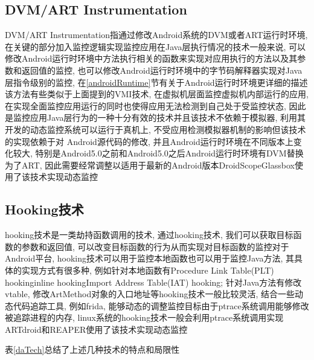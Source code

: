 \subsection{DVM/ART Instrumentation}
\label{artInstr}
DVM/ART Instrumentation指通过修改Android系统的DVM或者ART运行时环境, 在关键的部分加入监控逻辑实现监控应用在Java层执行情况的技术\juhao 一般来说, 可以修改Android运行时环境中方法执行相关的函数来实现对应用执行的方法以及其参数和返回值的监控, 也可以修改Android运行时环境中的字节码解释器实现对Java层指令级别的监控, 在\ref{androidRuntime}节有关于Android运行时环境更详细的描述\juhao 该方法有些类似于上面提到的VMI技术, 在虚拟机层面监控虚拟机内部运行的应用, 在实现全面监控应用运行的同时也使得应用无法检测到自己处于受监控状态, 因此是监控应用Java层行为的一种十分有效的技术\juhao 并且该技术不依赖于模拟器, 利用其开发的动态监控系统可以运行于真机上, 不受应用检测模拟器机制的影响\juhao 但该技术的实现依赖于对
Android源代码的修改, 并且Android运行时环境在不同版本上变化较大, 特别是Android5.0之前和Android5.0之后Android运行时环境有DVM替换为了ART, 因此需要经常调整以适用于最新的Android版本\juhao DroidScope\dunhao Glassbox使用了该技术实现动态监控\juhao

\subsection{Hooking技术}
hooking技术是一类劫持函数调用的技术, 通过hooking技术, 我们可以获取目标函数的参数和返回值, 可以改变目标函数的行为从而实现对目标函数的监控\juhao 对于Android平台, hooking技术可以用于监控本地函数也可以用于监控Java方法, 其具体的实现方式有很多种, 例如针对本地函数有Procedure Link Table(PLT) hooking\dunhao inline hooking\dunhao Import Address Table(IAT) hooking; 针对Java方法有修改vtable, 修改ArtMethod对象的入口地址等\juhao hooking技术一般比较灵活, 结合一些动态代码追踪工具, 例如frida, 能够动态的调整监控目标\juhao 由于ptrace系统调用能够修改被追踪进程的内存, linux系统的hooking技术一般会利用ptrace系统调用实现\juhao ARTdroid和REAPER使用了该技术实现动态监控\juhao

表\ref{daTech}总结了上述几种技术的特点和局限性\juhao 

